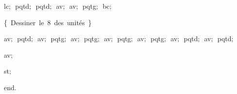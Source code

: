{\vspace{\neglskip}\mbox{\blc  \blk\idt  lc$;$\ pqtd$;$\ pqtd$;$\ av$;$\ av$;$\ pqtg$;$\ bc$;$\ }\par 
\vspace{\neglskip}\mbox{\blc  \blk\idt  \cmt  \{\ Dessiner\ le\ 8\ des\ unités\ \}\idt }\par 
\vspace{\neglskip}\mbox{\blc  \blk\idt  av$;$\ pqtd$;$\ av$;$\ pqtg$;$\ av$;$\ pqtg$;$\ av$;$\ pqtg$;$\ av$;$\ pqtg$;$\ av$;$\ pqtd$;$\ av$;$\ pqtd$;$}\par 
\vspace{\neglskip}\mbox{\blc  \blk\idt  av$;$}\par 
\vspace{\neglskip}\mbox{\blc  \blk\idt  st$;$\ }\par 
\vspace{\neglskip}\mbox{\blc  \idt  \mcl end\idt $.$}\par 

\medskip }


